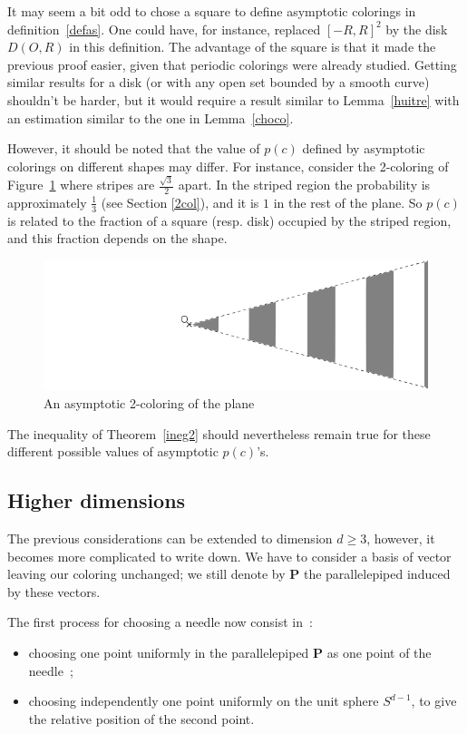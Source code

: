 \documentclass[a4paper,11pt]{article}
\theoremstyle{definition}
\theoremstyle{remark}
\begin{document}
It may seem a bit odd to chose a square to define asymptotic colorings in definition~\ref{defas}. One could have, for instance, replaced $[-R,R]^2$ by the disk $D(O,R)$ in this definition. The advantage of the square is that it made the previous proof easier, given that periodic colorings were already studied. Getting similar results for a disk (or with any open set bounded by a smooth curve) shouldn't be harder, but it would require a result similar to Lemma~\ref{huitre} with an estimation similar to the one in Lemma~\ref{choco}.

However, it should be noted that the value of $p(c)$ defined by asymptotic colorings on different shapes may differ. For instance, consider the 2-coloring of Figure~\ref{contrex} where stripes are $\frac{\sqrt{3}}{2}$ apart. In the striped region the probability is approximately $\frac13$ (see Section \ref{2col}), and it is $1$ in the rest of the plane. So $p(c)$ is related to the fraction of a square (resp. disk) occupied by the striped region, and this fraction depends on the shape.

\begin{figure}[!ht]
\center
\includegraphics[scale=0.45]{contrex.png}
\caption{\label{contrex} An asymptotic 2-coloring of the plane}
\end{figure}

The inequality of Theorem~\ref{ineg2} should nevertheless remain true for these different possible values of asymptotic $p(c)$'s.

\subsection{Higher dimensions}
\label{dim}
The previous considerations can be extended to dimension $d \geq 3$, however, 
it becomes more complicated to write down. We have to consider a basis of 
vector leaving our coloring unchanged; we still denote by $\mathbf{P}$ the 
parallelepiped induced by these vectors.

The first process for choosing a needle now consist in~: 
\begin{itemize}
	\item choosing one point uniformly in the parallelepiped $ \mathbf{P} $ as 
	one point of the needle~;
	\item choosing independently one point uniformly on the unit sphere 
	$S^{d-1}$, to give the relative position of the second point.
\end{itemize}
\end{document}
